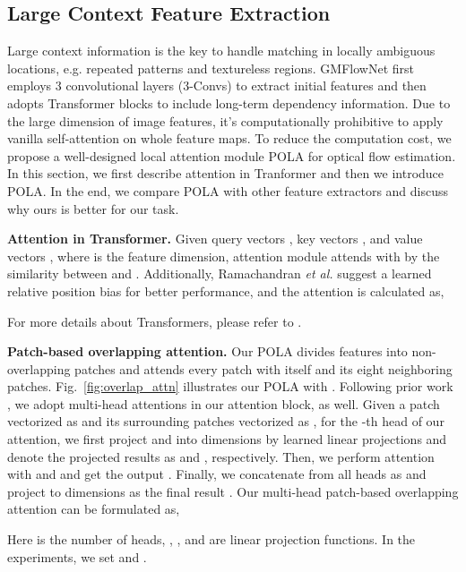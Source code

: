 \documentclass[10pt,twocolumn,letterpaper]{article}
\begin{document}
\subsection{Large Context Feature Extraction}

Large context information is the key to handle matching in locally ambiguous locations, e.g. repeated patterns and textureless regions. GMFlowNet first employs 3 convolutional layers (3-Convs) to extract initial features and then adopts Transformer blocks to include long-term dependency information. 
Due to the large dimension of image features,
it's computationally prohibitive to apply vanilla self-attention \cite{vaswani2017attention} on whole feature maps.
To reduce the computation cost, we propose a well-designed local attention module POLA for optical flow estimation. 
In this section, we first describe attention in Tranformer and then we introduce POLA. In the end, we compare POLA with other feature extractors and discuss why ours is better for our task.

{\bf Attention in Transformer.} Given query vectors , key vectors , and value vectors , where  is the feature dimension, attention module attends  with  by the similarity between  and . Additionally, Ramachandran \emph{et al.} \cite{ramachandran2019stand} suggest a learned relative position bias  for better performance, and the attention is calculated as,

For more details about Transformers, please refer to \cite{vaswani2017attention}. 


{\bf Patch-based overlapping attention.} 
Our POLA divides features into  non-overlapping patches and attends every patch with itself and its eight neighboring patches. Fig.~\ref{fig:overlap_attn} illustrates our POLA with . 
Following prior work \cite{vaswani2017attention,liu2021swin}, we adopt multi-head attentions in our attention block, as well. 
Given a patch vectorized as  and its surrounding  patches vectorized as , for the -th head of our attention, we first project  and  into  dimensions by learned linear projections and denote the projected results as  and , respectively. Then, we perform attention with  and  and get the output . Finally, we concatenate  from all heads as  and project  to  dimensions as the final result . Our multi-head patch-based overlapping attention can be formulated as,

Here  is the number of heads, , ,  and  are linear projection functions. In the experiments, we set  and .
\end{document}
